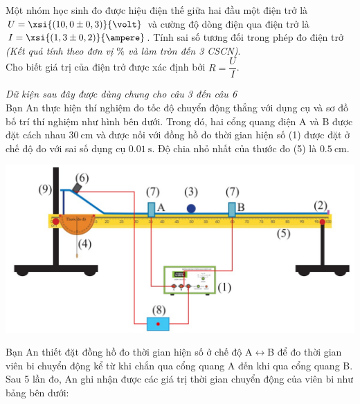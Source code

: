 \begin{ex}
\end{ex}
\begin{ex}
	Một nhóm học sinh đo được hiệu điện thế giữa hai đầu một điện trở là $U=\xsi{\left(10,0\pm0,3\right)}{\volt}$ và cường độ dòng điện qua điện trở là $I=\xsi{\left(1,3\pm0,2\right)}{\ampere}$. Tính sai số tương đối trong phép đo điện trở \textit{(Kết quả tính theo đơn vị $\si{\percent}$ và làm tròn đến 3 CSCN)}.\\
	Cho biết giá trị của điện trở được xác định bởi $R=\dfrac{U}{I}$.
\end{ex}
\textit{Dữ kiện sau đây được dùng chung cho câu 3 đến câu 6}\\
Bạn An thực hiện thí nghiệm đo tốc độ chuyển động thẳng với dụng cụ và sơ đồ bố trí thí nghiệm như hình bên dưới.
Trong đó, hai cổng quang điện A và B được đặt cách nhau $\SI{30}{\centi\meter}$ và được nối với đồng hồ đo thời gian hiện số (1) được đặt ở chế độ đo với sai số dụng cụ $\SI{0.01}{\second}$. Độ chia nhỏ nhất của thước đo (5) là $\SI{0.5}{\centi\meter}$.
\begin{center}
	\includegraphics[width=0.75\linewidth]{figs/G10-CHUONG1-3}
\end{center}
Bạn An thiết đặt đồng hồ đo thời gian hiện số ở chế độ A$\leftrightarrow$B để đo thời gian viên bi chuyển động kể từ khi chắn qua cổng quang A đến khi qua cổng quang B. Sau 5 lần đo, An ghi nhận được các giá trị thời gian chuyển động của viên bi như bảng bên dưới:
